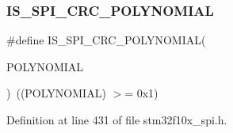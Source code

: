 \subsubsection{\texorpdfstring{I\+S\+\_\+\+S\+P\+I\+\_\+\+C\+R\+C\+\_\+\+P\+O\+L\+Y\+N\+O\+M\+I\+AL}{IS\_SPI\_CRC\_POLYNOMIAL}}
{\footnotesize\ttfamily \#define I\+S\+\_\+\+S\+P\+I\+\_\+\+C\+R\+C\+\_\+\+P\+O\+L\+Y\+N\+O\+M\+I\+AL(\begin{DoxyParamCaption}\item[{}]{P\+O\+L\+Y\+N\+O\+M\+I\+AL }\end{DoxyParamCaption})~((P\+O\+L\+Y\+N\+O\+M\+I\+AL) $>$= 0x1)}



Definition at line 431 of file stm32f10x\+\_\+spi.\+h.

